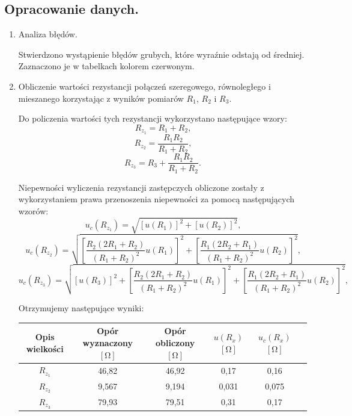 \documentclass [a4paper,11pt]{article}
\begin{document}
	\subsection{Opracowanie danych.}\label{sec:drm}
	\begin{enumerate}[label=\alph*)]
		
		\item Analiza błędów.
		
		Stwierdzono wystąpienie błędów grubych, które wyraźnie odstają od średniej. Zaznaczono je w tabelkach kolorem czerwonym.
		
		\item Obliczenie wartości rezystancji połączeń szeregowego, równoległego i mieszanego korzystając z wyników pomiarów $R_1$, $R_2$ i $R_3$.
		
		Do policzenia wartości tych rezystancji wykorzystano następujące wzory: 
		\begin{equation}
		\label{eq:rz1}
		R_{z_1}=R_1 + R_2\text{,}
		\end{equation}
		\begin{equation}
		\label{eq:rz2}
		R_{z_2}=\frac{R_1 R_2}{R_1 + R_2}\text{,}
		\end{equation}
		\begin{equation}
		\label{eq:rz3}
		R_{z_3}=R_3 + \frac{R_1 R_2}{R_1 + R_2}\text{.}
		\end{equation}
		
		Niepewności wyliczenia rezystancji zastępczych obliczone zostały z wykorzystaniem prawa przenoszenia niepewności za pomocą następujących wzorów:
		\begin{equation}
		\label{eq:nrz1}
		u_c(R_{z_1})=\sqrt{\left[ u(R_1) \right]^2 + \left[ u(R_2) \right]^2}\text{,}
		\end{equation}
		\begin{equation}
		\label{eq:nrz2}
		u_c(R_{z_2})=\sqrt{\left[ \frac{R_2(2R_1+R_2)}{(R_1+R_2)^2} u(R_1) \right]^2 + \left[ \frac{R_1(2R_2+R_1)}{(R_1+R_2)^2} u(R_2) \right]^2}\text{,}
		\end{equation}
		\begin{equation}
		\label{eq:nrz3}
		u_c(R_{z_3})=\sqrt{\left[ u(R_3) \right]^2 + \left[ \frac{R_2(2R_1+R_2)}{(R_1+R_2)^2} u(R_1) \right]^2 + \left[ \frac{R_1(2R_2+R_1)}{(R_1+R_2)^2} u(R_2) \right]^2}\text{,}
		\end{equation}
		
		Otrzymujemy następujące wyniki:
		\begin{center}
			\begin{tabular}{|c|c|c|c|c|c|}
				\hline Opis wielkości & Opór wyznaczony $[\mathrm{\Omega}]$ & Opór obliczony $[\mathrm{\Omega}]$ & $u(R_x)$ $[\mathrm{\Omega}]$ & $u_c(R_x)$ $[\mathrm{\Omega}]$ \\
				\hline $R_{z_1}$ & 46,82 & 46,92 & 0,17 & 0,16  \\
				\hline $R_{z_2}$ & 9,567 & 9,194 & 0,031 & 0,075  \\  
				\hline $R_{z_3}$ & 79,93 & 79,51  & 0,31 &  0,17 \\ 
				\hline 
			\end{tabular} 
		\end{center}
	
	\end{enumerate}
	
\end{document}
